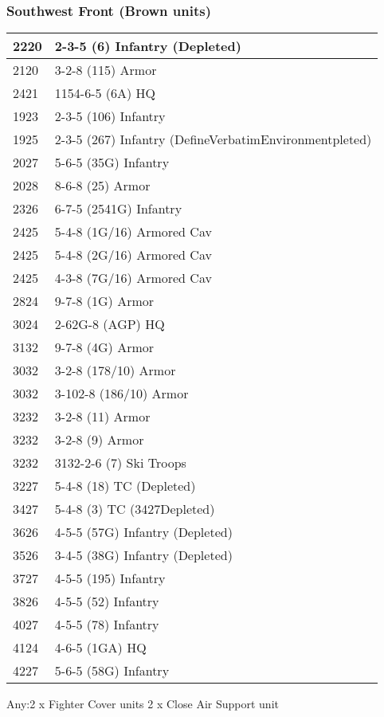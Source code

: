 \documentclass[10pt]{article}
\begin{document}
\newpage

\subsubsection*{Southwest Front (Brown units)}

\begin{tabular}{ll}
2220 & 2-3-5 (6) Infantry (Depleted) \\\hline
2120 & 3-2-8 (115) Armor \\
2421 & 1154-6-5 (6A) HQ \\
1923 & 2-3-5 (106) Infantry \\
1925 & 2-3-5 (267) Infantry (DefineVerbatimEnvironmentpleted) \\
2027 & 5-6-5 (35G) Infantry \\
2028 & 8-6-8 (25) Armor \\
2326 & 6-7-5 (2541G) Infantry \\
2425 & 5-4-8 (1G/16) Armored Cav \\
2425 & 5-4-8 (2G/16) Armored Cav \\
2425 & 4-3-8 (7G/16) Armored Cav \\
2824 & 9-7-8 (1G) Armor \\
3024 & 2-62G-8 (AGP) HQ \\
3132 & 9-7-8 (4G) Armor \\
3032 & 3-2-8 (178/10) Armor \\
3032 & 3-102-8 (186/10) Armor \\
3232 & 3-2-8 (11) Armor \\
3232 & 3-2-8 (9) Armor \\
3232 & 3132-2-6 (7) Ski Troops \\
3227 & 5-4-8 (18) TC (Depleted) \\
3427 & 5-4-8 (3) TC (3427Depleted) \\
3626 & 4-5-5 (57G) Infantry (Depleted) \\
3526 & 3-4-5 (38G) Infantry (Depleted) \\
3727 & 4-5-5 (195) Infantry \\
3826 & 4-5-5 (52) Infantry \\
4027 & 4-5-5 (78) Infantry \\
4124 & 4-6-5 (1GA) HQ \\
4227 & 5-6-5 (58G) Infantry \\\hline
\end{tabular}


Any:2 x Fighter Cover units
2 x Close Air Support unit
\end{document}
